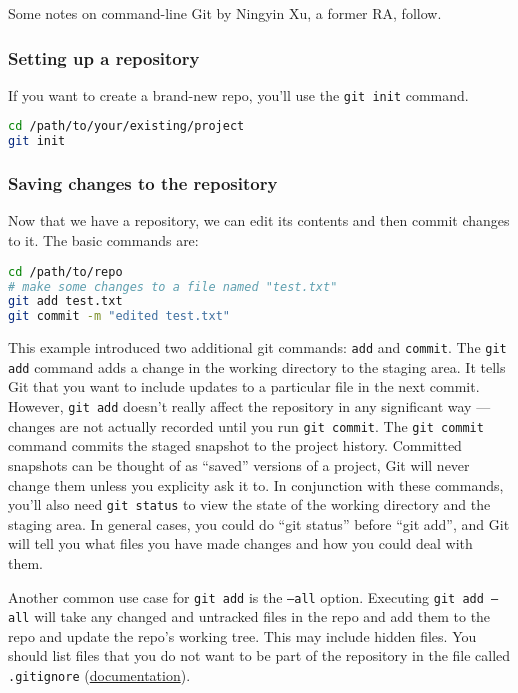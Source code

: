 Some notes on command-line Git by Ningyin Xu, a former RA, follow.

\subsubsection{Setting up a repository}

If you want to create a brand-new repo, you'll use the \texttt{git init} command. 
\begin{lstlisting}[language=bash]
cd /path/to/your/existing/project 
git init
\end{lstlisting}

\subsubsection{Saving changes to the repository}
Now that we have a repository, we can edit its contents and then commit changes to it.
The basic commands are:
\begin{lstlisting}[language=bash]
cd /path/to/repo 
# make some changes to a file named "test.txt"
git add test.txt
git commit -m "edited test.txt"
\end{lstlisting}
This example introduced two additional git commands: \texttt{add} and \texttt{commit}.
The \texttt{git add} command adds a change in the working directory to the staging area.
It tells Git that you want to include updates to a particular file in the next commit.
However, \texttt{git add} doesn't really affect the repository in any significant way — changes are not actually recorded until you run \texttt{git commit}.
The \texttt{git commit} command commits the staged snapshot to the project history.
Committed snapshots can be thought of as ``saved'' versions of a project, Git will never change them unless you explicity ask it to.
In conjunction with these commands, you'll also need \texttt{git status} to view the state of the working directory and the staging area.
In general cases, you could do ``git status'' before ``git add'', and Git will tell you what files you have made changes and how you could deal with them.

Another common use case for \texttt{git add} is the \texttt{--all} option. 
Executing \texttt{git add --all} will take any changed and untracked files in the repo and
add them to the repo and update the repo's working tree.
This may include hidden files. 
You should list files that you do not want to be part of the repository in the file called \texttt{.gitignore} (\href{https://git-scm.com/docs/gitignore}{documentation}).


